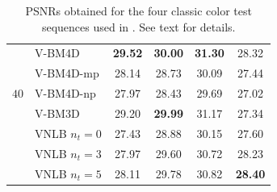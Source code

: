 \documentclass{llncs}
\newcommand{\best}[1]{\textbf{#1}}
\begin{document}
\begin{table}[htp!]
\begin{center}
\begin{tabular}{ c | l |c c c c}
		\multirow{5}{*}{$40$} & V-BM4D \cite{Maggioni2012} & \best{29.52} & \best{30.00} & \best{31.30} &       28.32  \\
		                      & V-BM4D-mp                  &       28.14  &       28.73  &       30.09  &       27.44  \\
		                      & V-BM4D-np                  &       27.97  &       28.43  &       29.69  &       27.02  \\
									 & V-BM3D                     &       29.20  & \best{29.99} &       31.17  &       27.34  \\
		                      & VNLB $n_t = 0$             &       27.43  &       28.88  &       30.15  &       27.60  \\
									 & VNLB $n_t = 3$             &       27.97  &       29.60  &       30.72  &       28.23  \\
									 & VNLB $n_t = 5$             &       28.11  &       29.78  &       30.82  & \best{28.40} \\\hline
	\end{tabular}
	\end{center}
	\caption{PSNRs obtained for the four classic color test sequences used in
	\cite{Maggioni2012}. See text for details.}
	\label{tab:psnr-classic}
\end{table}
\end{document}
